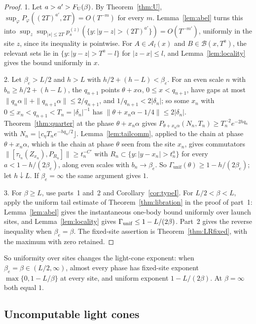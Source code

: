 \begin{proof}
1. Let $a>a'>F_{\mathrm U}(\beta)$. By Theorem~\ref{thm:U}, $\sup_\varphi P_\varphi((2T)^{a'},2T)=O(T^{-m})$ for every $m$. Lemma~\ref{lem:abel} turns this into $\sup_z\sup_{|s|\le2T}p^{(z)}_s(\{y:|y-z|>(2T)^{a'}\})=O(T^{-m'})$, uniformly in the site $z$, since its inequality is pointwise. For $A\in\mathcal A_l(x)$ and $B\in\mathcal B(x,T^a)$, the relevant sets lie in $\{y:|y-z|>T^a-l\}$ for $|z-x|\le l$, and Lemma~\ref{lem:locality} gives the bound uniformly in $x$.

2. Let $\beta_e>L/2$ and $h>L$ with $h/2+(h-L)<\beta_e$. For an even scale $n$ with $b_n\ge h/2+(h-L)$, the $q_{n+1}$ points $\theta+x\alpha$, $0\le x<q_{n+1}$, have gaps at most $\|q_n\alpha\|+\|q_{n+1}\alpha\|\le2/q_{n+1}$, and $1/q_{n+1}<2|\delta_n|$; so some $x_n$ with $0\le x_n<q_{n+1}<T_n=|\delta_n|^{-1}$ has $\|\theta+x_n\alpha-1/4\|\le2|\delta_n|$. Theorem~\ref{thm:quarter} at the phase $\theta+x_n\alpha$ gives $P_{\theta+x_n\alpha}(N_n,T_n)\ge T_n^{-2}e^{-2hq_n}$ with $N_n=\lfloor c_\eta T_ne^{-hq_n/2}\rfloor$. Lemma~\ref{lem:tailcomm}, applied to the chain at phase $\theta+x_n\alpha$, which is the chain at phase $\theta$ seen from the site $x_n$, gives commutators $\|[\tau_{t_n}(Z_{x_n}),P_{R_n}]\|\ge t_n^{-C'}$ with $R_n\subset\{y:|y-x_n|>t_n^a\}$ for every $a<1-h/(2\beta_e)$, along even scales with $b_n\to\beta_e$. So $\Gamma_{\mathrm{unif}}(\theta)\ge1-h/(2\beta_e)$; let $h\downarrow L$. If $\beta_e=\infty$ the same argument gives $1$.

3. For $\beta\ge L$, use parts~1 and~2 and Corollary~\ref{cor:typeI}. For $L/2<\beta<L$, apply the uniform tail estimate of Theorem~\ref{thm:libration} in the proof of part~1: Lemma~\ref{lem:abel} gives the instantaneous one-body bound uniformly over launch sites, and Lemma~\ref{lem:locality} gives $\Gamma_{\rm unif}\le1-L/(2\beta)$. Part~2 gives the reverse inequality when $\beta_e=\beta$. The fixed-site assertion is Theorem~\ref{thm:LRfixed}, with the maximum with zero retained.
\end{proof}

So uniformity over sites changes the light-cone exponent: when $\beta_e=\beta\in(L/2,\infty)$, almost every phase has fixed-site exponent $\max\{0,1-L/\beta\}$ at every site, and uniform exponent $1-L/(2\beta)$. At $\beta=\infty$ both equal $1$.

\subsection{Uncomputable light cones}


